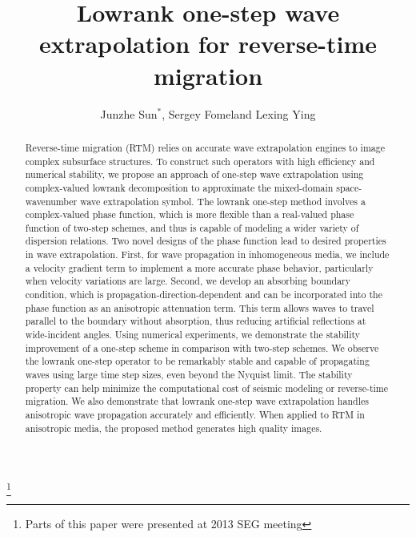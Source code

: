 
\title{Lowrank one-step wave extrapolation for reverse-time migration}
\author{Junzhe Sun$^*$\footnotemark[1], Sergey Fomel\footnotemark[1] and Lexing Ying\footnotemark[2]}
\maketitle

\address{
\footnotemark[1]Bureau of Economic Geology \\
John A. and Katherine G. Jackson School of Geosciences \\
The University of Texas at Austin \\
University Station, Box X \\
Austin, TX 78713-8924 \\
\footnotemark[2]Department of Mathematics \\
450 Serra Mall, Bldg 380 \\
Stanford University \\
Stanford, CA 94305-2125
}

\footnote{Parts of this paper were presented at 2013 SEG meeting}


\begin{abstract}
Reverse-time migration (RTM) relies on accurate wave extrapolation engines to image complex subsurface structures. To construct such operators with high efficiency and numerical stability, we propose an approach of one-step wave extrapolation using complex-valued lowrank decomposition to approximate the mixed-domain space-wavenumber wave extrapolation symbol. The lowrank one-step method involves a complex-valued phase function, which is more flexible than a real-valued phase function of two-step schemes, and thus is capable of modeling a wider variety of dispersion relations. Two novel designs of the phase function lead to desired properties in wave extrapolation. First, for wave propagation in inhomogeneous media, we include a velocity gradient term to implement a more accurate phase behavior, particularly when velocity variations are large. Second, we develop an absorbing boundary condition, which is propagation-direction-dependent and can be incorporated into the phase function as an anisotropic attenuation term. This term allows waves to travel parallel to the boundary without absorption, thus reducing artificial reflections at wide-incident angles. Using numerical experiments, we demonstrate the stability improvement of a one-step scheme in comparison with two-step schemes. We observe the lowrank one-step operator to be remarkably stable and capable of propagating waves using large time step sizes, even beyond the Nyquist limit. The stability property can help minimize the computational cost of seismic modeling or reverse-time migration. We also demonstrate that lowrank one-step wave extrapolation handles anisotropic wave propagation accurately and efficiently. When applied to RTM in anisotropic media, the proposed method generates high quality images.
\end{abstract}

